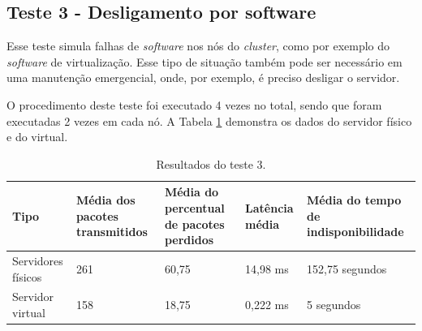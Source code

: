 

\newpage
\subsection{Teste 3 - Desligamento por software}

Esse teste simula falhas de \textit{software} nos nós do \textit{cluster}, como por exemplo do \textit{software} de virtualização. Esse tipo de 
situação também pode ser necessário em uma manutenção emergencial, onde, por exemplo, é preciso desligar o servidor.


O procedimento deste teste foi executado 4 vezes no total, sendo que foram executadas 2 vezes em cada nó. A Tabela \ref{tab:teste3resultados}
demonstra os dados do servidor físico e do virtual.

\begin{table}[h!]
\caption{Resultados do teste 3.}
\label{tab:teste3resultados}
\begin{center}
\begin{tabular}{|l|p{2.5cm}|p{3.5cm}|p{1.5cm}|p{3cm}|}\hline
\textbf{Tipo} & \textbf{Média dos pacotes transmitidos} & \textbf{Média do percentual de pacotes perdidos} & \textbf{Latência média} & \textbf{Média do tempo de indisponibilidade} \\\hline
Servidores físicos & 261 & 60,75 & 14,98 ms & 152,75 segundos \\\hline
Servidor virtual & 158 & 18,75 & 0,222 ms & 5 segundos \\\hline
\end{tabular}
\end{center}
\end{table}

